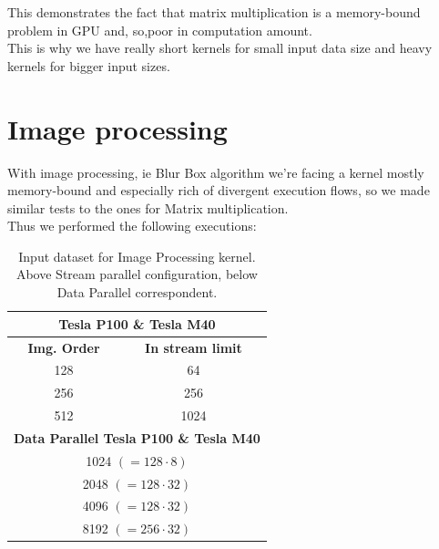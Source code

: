 This demonstrates the fact that matrix multiplication is a memory-bound problem in GPU and, so,poor in computation amount.\\
This is why we have really short kernels for small input data size and heavy kernels for bigger input sizes.


\section{Image processing}
With image processing, ie Blur Box algorithm we're facing a kernel mostly memory-bound and especially rich of divergent execution flows, so we made similar tests to the ones for Matrix multiplication.\\
Thus we performed the following executions:


\begin{table}	
	\centering
	\begin{tabular}{| c | c |} 
		\hline
		
		 \multicolumn{2}{c}{\textbf{Tesla P100} \& \textbf{Tesla M40}} \\ [0.5ex]
		\hline\hline
		
		\textbf{Img. Order} & \textbf{In stream limit} \\ 
		\hline
		128 & 64 \\ 
		\hline		
		256	& 256 \\ 
		\hline			
		512	& 1024 \\ 
		\hline	
		\hline
			

	\multicolumn{2}{c}{\textbf{Data Parallel Tesla P100 \& Tesla M40}} \\ [0.5ex] 
		\hline\hline		
		\multicolumn{2}{c}{1024 \((=128\cdot8)\)} \\ [0.5ex] 
		
		
		
		\multicolumn{2}{c}{2048 \((=128\cdot32)\)} \\ [0.5ex] 
		
		\multicolumn{2}{c}{4096 \((=128\cdot32)\)} \\ [0.5ex] 
		
		\multicolumn{2}{c}{8192 \((=256\cdot32)\)} \\ [0.5ex] 
		\hline
		
		
	\end{tabular}
	\caption{Input dataset for Image Processing kernel. Above Stream parallel configuration, below Data Parallel correspondent.}	
	\label{tab:imgdata}		
\end{table}

